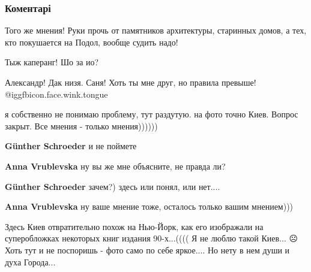  
 
 
 
 
\subsubsection{Коментарі}
\label{sec:05_11_2021.fb.fb_group.story_kiev_ua.6.kiev_gorod_foto.cmt}

\begin{itemize} %
Того же мнения! Руки прочь от памятников архитектуры, старинных домов, а тех, кто покушается на Подол, вообще судить надо!

Тыж каперанг! Шо за ио?

\begin{itemize} %
Александр! Дак низя. Саня! Хоть ты мне друг, но правила превыше! @igg{fbicon.face.wink.tongue} 
\end{itemize} %


я собственно не понимаю проблему, тут раздутую. на фото точно Киев. Вопрос
закрыт. Все мнения - только мнения))))))

\begin{itemize} %
\textbf{Günther Schroeder} и не поймете

\begin{itemize} %
\textbf{Anna Vrublevska} ну вы же мне объясните, не правда ли?

\textbf{Günther Schroeder} зачем?) здесь или понял, или нет....

\textbf{Anna Vrublevska} ну ваше мнение тоже, осталось только вашим мнением)))
\end{itemize} %

\end{itemize} %


Здесь Киев отвратительно похож на Нью-Йорк, как его изображали на суперобложках
некоторых книг издания 90-х...(((( Я не люблю такой Киев... ☹️ Хоть тут и не
поспоришь - фото само по себе яркое.... Но нету в нем души и духа Города...


\end{itemize}
